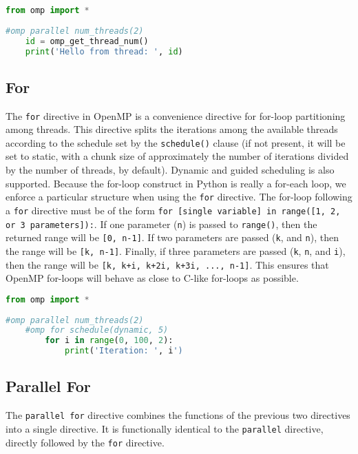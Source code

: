 \documentclass[letterpaper,12pt]{article} %
\begin{document}
\begin{lstlisting}[language=Python]
from omp import *
 
#omp parallel num_threads(2)
	id = omp_get_thread_num()
	print('Hello from thread: ', id)
\end{lstlisting}



\subsection{For}
The \texttt{for} directive in OpenMP is a convenience directive for for-loop partitioning among threads. This directive splits the iterations among the available threads according to the schedule set by the \texttt{schedule()} clause (if not present, it will be set to static, with a chunk size of approximately the number of iterations divided by the number of threads, by default). Dynamic and guided scheduling is also supported. Because the for-loop construct in Python is really a for-each loop, we enforce a particular structure when using the \texttt{for} directive. The for-loop following a \texttt{for} directive must be of the form \texttt{for [single variable] in range([1, 2, or 3 parameters]):}. If one parameter (\texttt{n}) is passed to \texttt{range()}, then the returned range will be \texttt{[0, n-1]}. If two parameters are passed (\texttt{k}, and \texttt{n}), then the range will be \texttt{[k, n-1]}. Finally, if three parameters are passed (\texttt{k}, \texttt{n}, and \texttt{i}), then the range will be \texttt{[k, k+i, k+2i, k+3i, ..., n-1]}. This ensures that OpenMP for-loops will behave as close to C-like for-loops as possible.

\begin{lstlisting}[language=Python]
from omp import *
 
#omp parallel num_threads(2)
    #omp for schedule(dynamic, 5)
        for i in range(0, 100, 2):
            print('Iteration: ', i')
\end{lstlisting}



\subsection{Parallel For}
The \texttt{parallel for} directive combines the functions of the previous two directives into a single directive. It is functionally identical to the \texttt{parallel} directive, directly followed by the \texttt{for} directive.
\end{document}
